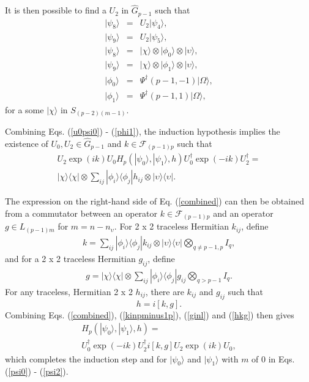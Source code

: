 \documentclass[twocolumn,amsmath,amssymb]{revtex4-1}
\begin{document}
It is then possible to find a $U_2$ in $\hat{G}_{p-1}$ such that
\begin{subequations}
\begin{eqnarray}
\label{u2psi4}
|\psi_8 \rangle  & = & U_2 |\psi_4 \rangle , \\
\label{u2psi5}
|\psi_9 \rangle  & = & U_2 |\psi_5 \rangle , \\
\label{psi6}
|\psi_8 \rangle  & = & | \chi \rangle  \otimes |\phi_0 \rangle  \otimes |\upsilon \rangle , \\
\label{psi7}
|\psi_9 \rangle  & = & | \chi \rangle  \otimes |\phi_1 \rangle  \otimes |\upsilon \rangle , \\
\label{phi0}
|\phi_0 \rangle  & = & \Psi^{\dagger}( p-1, -1) |\Omega \rangle , \\
\label{phi1}
|\phi_1 \rangle  & = & \Psi^{\dagger}( p-1, 1) |\Omega \rangle ,
\end{eqnarray}
\end{subequations}
for a some $|\chi \rangle $ in $S_{(p-2) (m-1)}$.



Combining Eqs. (\ref{u0psi0}) - (\ref{phi1}), the induction hypothesis
implies the existence of $U_0, U_2 \in \hat{G}_{p-1}$
and $k \in \mathcal{F}_{(p-1) p}$ such that
\begin{multline}
\label{combined}
U_2 \exp( i k) U_0 H_p( |\psi_0 \rangle , |\psi_1 \rangle , h) U_0^\dagger \exp( -i k) U_2^\dagger = \\
|\chi \rangle  \langle  \chi| \otimes \sum_{ij} |\phi_i \rangle  \langle \phi_j| h_{ij} \otimes |\upsilon \rangle  \langle \upsilon|.
\end{multline}

The expression on the right-hand side of Eq. (\ref{combined}) can then be obtained from a
commutator between an operator $k \in \mathcal{F}_{(p-1) p}$ and
an operator $g \in L_{(p-1) m}$ for $m = n - n_{\upsilon}$.
For 2 x 2 traceless Hermitian $k_{ij}$, define
\begin{multline}
\label{kinpminus1p}
k = \sum_{ij} |\phi_i \rangle  \langle \phi_j| k_{ij} \otimes |\upsilon \rangle  \langle \upsilon| \bigotimes_{q \ne p-1, p} I_q,
\end{multline}
and for a 2 x 2 traceless Hermitian $g_{ij}$, define
\begin{multline}
\label{ginl}
g  =  |\chi \rangle  \langle \chi| \otimes \sum_{ij} |\phi_i \rangle  \langle \phi_j| g_{ij} \bigotimes_{q > p-1} I_q.
\end{multline}
For any traceless, Hermitian 2 x 2 $h_{ij}$, there are $k_{ij}$ and $g_{ij}$ 
such that
\begin{equation}
\label{hkg}
h = i [ k, g].
\end{equation}
Combining Eqs. (\ref{combined}), (\ref{kinpminus1p}), (\ref{ginl}) and (\ref{hkg}) then gives
\begin{multline}
\label{endresult}
H_p( |\psi_0 \rangle , |\psi_1 \rangle , h) = \\ 
U_0^\dagger \exp(-ik) U_2^\dagger i[k, g] U_2 \exp(ik) U_0,
\end{multline}
which completes the induction step and for $|\psi_0 \rangle $ and $|\psi_1 \rangle $ with $m$ of 0
in Eqs. (\ref{psi0}) - (\ref{psi2}).
\end{document}
